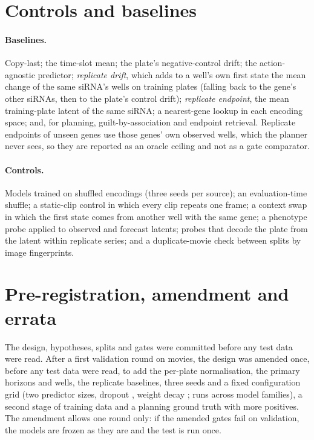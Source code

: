 \section{Controls and baselines}\label{sec:baselines}

\paragraph{Baselines.} Copy-last; the time-slot mean; the plate's negative-control drift; the
action-agnostic predictor; \emph{replicate drift}, which adds to a well's own first state the
mean change of the same siRNA's wells on training plates (falling back to the gene's other
siRNAs, then to the plate's control drift); \emph{replicate endpoint}, the mean training-plate
latent of the same siRNA; a nearest-gene lookup in each encoding space; and, for planning,
guilt-by-association and endpoint retrieval. Replicate endpoints of unseen genes use those genes'
own observed wells, which the planner never sees, so they are reported as an oracle ceiling and
not as a gate comparator.

\paragraph{Controls.} Models trained on shuffled encodings (three seeds per source); an
evaluation-time shuffle; a static-clip control in which every clip repeats one frame; a context
swap in which the first state comes from another well with the same gene; a phenotype probe
applied to observed and forecast latents; probes that decode the plate from the latent within
replicate series; and a duplicate-movie check between splits by image fingerprints.

\section{Pre-registration, amendment and errata}\label{sec:prereg}

The design, hypotheses, splits and gates were committed before any test data were read. After a
first validation round on \NMoviesStageOne{} movies, the design was amended once, before any test
data were read, to add the per-plate normalisation, the primary horizons and wells, the
replicate baselines, three seeds and a fixed configuration grid (two predictor sizes, dropout
\Dropouts{}, weight decay \WeightDecays{}; \NGridRuns{} runs across \NFamilies{} model families),
a second stage of training data and a planning ground truth with more positives. The amendment
allows one round only: if the amended gates fail on validation, the models are frozen as they
are and the test is run once.

